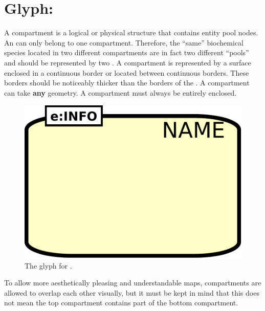 
\section{Glyph: }\label{sec:compartment}

A compartment is a logical or physical structure that contains entity pool nodes. An  can only belong to one compartment. Therefore, the ``same'' biochemical species located in two different compartments are in fact two different ``pools'' and should be represented by two .  A compartment is represented by a surface enclosed in a continuous border or located between continuous borders. These borders should be noticeably thicker than the borders of the . A compartment can take \textbf{any} geometry. A compartment must always be entirely enclosed.

\begin{figure}[H]
  \centering
  \includegraphics[scale = 0.3]{images/compartment}
  \caption{The \PD glyph for .}
  \label{fig:compartment}
\end{figure}

To allow more aesthetically pleasing and understandable maps, compartments are allowed to overlap each other visually, but it must be kept in mind that this does not mean the top compartment contains part of the bottom compartment. 